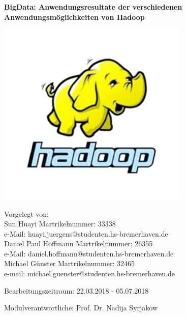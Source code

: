 \documentclass[12pt,ngerman,twoside]{scrartcl}
\begin{document}


\pagestyle{empty}

\begin{titlepage}
\centering
\begin{figure}[htbp]
\hspace*{3.3cm}
\end{figure}
        {\LARGE\bfseries BigData: Anwendungsresultate der verschiedenen Anwendungsmöglichkeiten von Hadoop \par}
\includegraphics[width=0.68\textwidth]{pics/hadoop.png}\par%
\vspace{0.1cm}
        Vorgelegt von: \\
        Sun Huayi
        Martrikelnummer: 33338 \\ 
	e-Mail: huayi.juergens@studenten.hs-bremerhaven.de \\
        Daniel Paul Hoffmann 
        Martrikelnummer: 26355 \\
	e-Mail: daniel.hoffmann@studenten.hs-bremerhaven.de \\
        Michael Günster 
        Martrikelnummer: 32465 \\
	e-mail: michael.guenster@studenten.hs-bremerhaven.de \par

        Bearbeitungszeitraum: 22.03.2018 - 05.07.2018

\vspace*{\fill}
{\small
        Modulverantwortliche: Prof. Dr. Nadija Syrjakow\par}
\end{titlepage}
\end{document}
